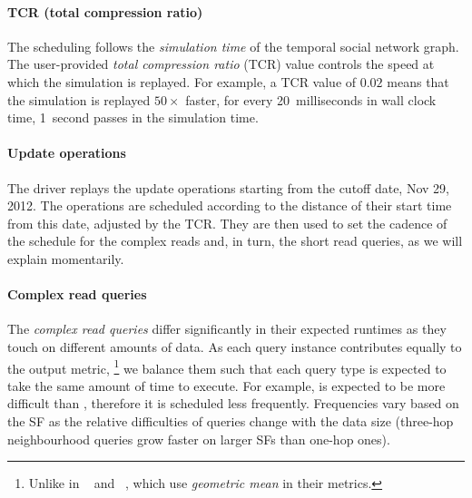 \paragraph{TCR (total compression ratio)}
%
The scheduling follows the \emph{simulation time} of the temporal social network graph.
The user-provided \emph{total compression ratio} (TCR) value controls the speed at which the simulation is replayed.
For example, a TCR value of $0.02$ means that the simulation is replayed $50\times$ faster, \ie for every 20~milliseconds in wall clock time, 1~second passes in the simulation time.

\paragraph{Update operations}
%
The driver replays the update operations starting from the cutoff date, Nov 29, 2012.
The operations are scheduled according to the distance of their start time from this date, adjusted by the TCR.
They are then used to set the cadence of the schedule for the complex reads and, in turn, the short read queries, as we will explain momentarily.

\paragraph{Complex read queries}
%
The \emph{complex read queries} differ significantly in their expected runtimes as they touch on different amounts of data.
As each query instance contributes equally to the output metric,%
\footnote{Unlike in \tpcH~\cite{tpch} and \snbbi~\cite{DBLP:journals/pvldb/SzarnyasWSSBWZB22}, which use \emph{geometric mean} in their metrics.}
we balance them such that each query type is expected to take the same amount of time to execute.
For example, \CR[14 (new)] is expected to be more difficult than \CR[13], therefore it is scheduled less frequently.
Frequencies vary based on the SF as the relative difficulties of queries change with the data size
(\eg three-hop neighbourhood queries grow faster on larger SFs than one-hop ones).

